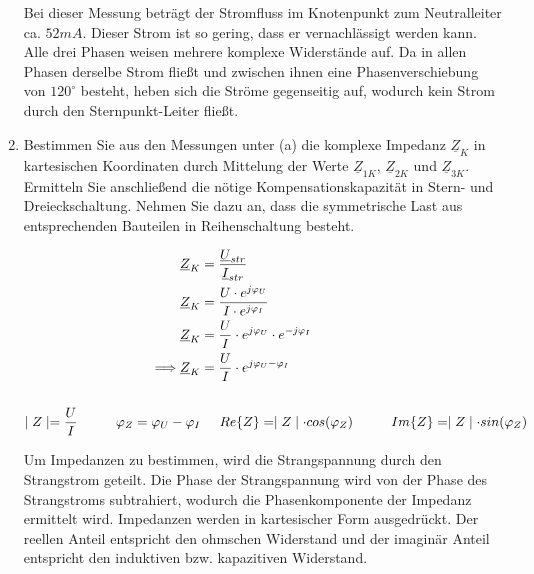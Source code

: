 \begin{enumerate}[label=\alph*)]
	 		
	 		Bei dieser Messung beträgt der Stromfluss im Knotenpunkt zum Neutralleiter ca. $52 mA$. Dieser Strom ist so gering, dass er vernachlässigt werden kann. Alle drei Phasen weisen mehrere komplexe Widerstände auf. Da in allen Phasen derselbe Strom fließt und zwischen ihnen eine Phasenverschiebung von $120^\circ$ besteht, heben sich die Ströme gegenseitig auf, wodurch kein Strom durch den Sternpunkt-Leiter fließt.
	 		
	 		\item Bestimmen Sie aus den Messungen unter (a) die komplexe Impedanz $\underline{Z}_{K}$ in kartesischen Koordinaten durch Mittelung der Werte $\underline{Z}_{1K}$, $\underline{Z}_{2K}$ und $\underline{Z}_{3K}$. Ermitteln Sie anschließend die nötige Kompensationskapazität in Stern- und Dreieckschaltung. Nehmen Sie dazu an, dass die symmetrische Last aus entsprechenden Bauteilen in Reihenschaltung besteht.
	 		
	 		\begin{align*}
	 			\underline{Z}_{K} &= \frac{\underline{U}_{str}}{\underline{I}_{str}}\\
	 			\underline{Z}_{K} &= \frac{U\cdot  e^{j\varphi_{U}}}{I\cdot  e^{j\varphi_{I}}}\\
	 			\underline{Z}_{K} &= \frac{U}{I} \cdot  e^{j\varphi_{U}}\cdot e^{-j\varphi_{I}}\\
	 			\Longrightarrow\underline{Z}_{K} &= \frac{U}{I} \cdot  e^{j{\varphi_{U} - \varphi_{I}}} \\ \ \\
	 			\mid Z \mid			= \frac{U}{I} \hspace{1cm}
	 			\varphi _{Z} 		= {\varphi_{U} - \varphi_{I}}
	 			&\hspace{0.5cm}
	 			Re\{Z\} 			= \mid Z \mid \cdot cos(\varphi_{Z}) \hspace{1cm}
	 			Im\{Z\} 			= \mid Z \mid \cdot sin(\varphi_{Z})\\
	 		\end{align*}
	 		
	 		Um Impedanzen zu bestimmen, wird die Strangspannung durch den Strangstrom geteilt. Die Phase der Strangspannung wird von der Phase des Strangstroms subtrahiert, wodurch die Phasenkomponente der Impedanz ermittelt wird. Impedanzen werden in kartesischer Form ausgedrückt. Der reellen Anteil entspricht den ohmschen Widerstand und der imaginär Anteil entspricht den induktiven bzw. kapazitiven Widerstand.
	 		

\end{enumerate}
